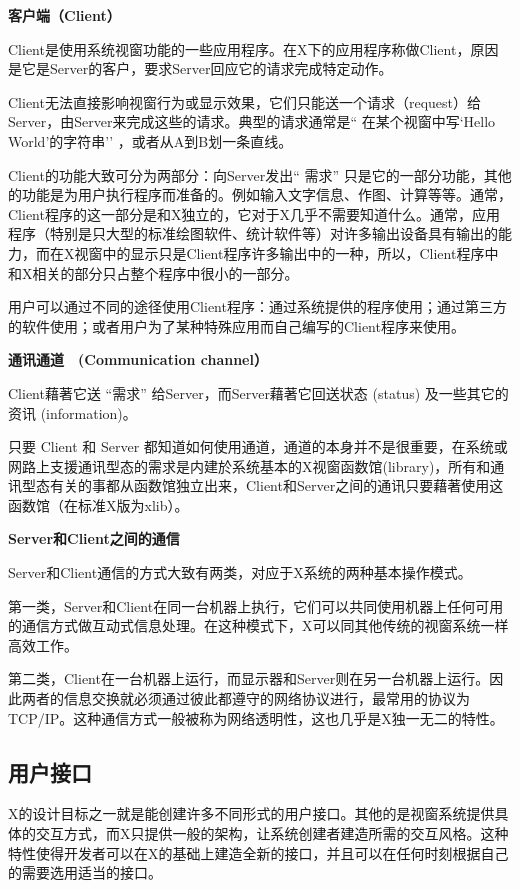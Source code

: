 \documentclass[doctor,openright,twoside]{sjtuthesis}
\theoremstyle{plain}
\theoremstyle{definition}
\theoremstyle{remark}
\theoremstyle{ocrenumbox}
\theoremstyle{plain}
\begin{document}
\textbf{客户端（Client）}

Client是使用系统视窗功能的一些应用程序。在X下的应用程序称做Client，原因是它是Server的客户，要求Server回应它的请求完成特定动作。

Client无法直接影响视窗行为或显示效果，它们只能送一个请求（request）给Server，由Server来完成这些的请求。典型的请求通常是`` 在某个视窗中写`Hello World'的字符串'' ，或者从A到B划一条直线。

Client的功能大致可分为两部分：向Server发出`` 需求'' 只是它的一部分功能，其他的功能是为用户执行程序而准备的。例如输入文字信息、作图、计算等等。通常，Client程序的这一部分是和X独立的，它对于X几乎不需要知道什么。通常，应用程序（特别是只大型的标准绘图软件、统计软件等）对许多输出设备具有输出的能力，而在X视窗中的显示只是Client程序许多输出中的一种，所以，Client程序中和X相关的部分只占整个程序中很小的一部分。

用户可以通过不同的途径使用Client程序：通过系统提供的程序使用；通过第三方的软件使用；或者用户为了某种特殊应用而自己编写的Client程序来使用。

\textbf{通讯通道　(Communication channel）}

Client藉著它送 ``需求'' 给Server，而Server藉著它回送状态 (status) 及一些其它的资讯 (information)。

只要 Client 和 Server 都知道如何使用通道，通道的本身并不是很重要，在系统或网路上支援通讯型态的需求是内建於系统基本的X视窗函数馆(library)，所有和通讯型态有关的事都从函数馆独立出来，Client和Server之间的通讯只要藉著使用这函数馆（在标准X版为xlib）。

\textbf{Server和Client之间的通信}

Server和Client通信的方式大致有两类，对应于X系统的两种基本操作模式。

第一类，Server和Client在同一台机器上执行，它们可以共同使用机器上任何可用的通信方式做互动式信息处理。在这种模式下，X可以同其他传统的视窗系统一样高效工作。

第二类，Client在一台机器上运行，而显示器和Server则在另一台机器上运行。因此两者的信息交换就必须通过彼此都遵守的网络协议进行，最常用的协议为TCP/IP。这种通信方式一般被称为网络透明性，这也几乎是X独一无二的特性。

\hypertarget{section-9}{%
\subsection{用户接口}\label{section-9}}

X的设计目标之一就是能创建许多不同形式的用户接口。其他的是视窗系统提供具体的交互方式，而X只提供一般的架构，让系统创建者建造所需的交互风格。这种特性使得开发者可以在X的基础上建造全新的接口，并且可以在任何时刻根据自己的需要选用适当的接口。
\end{document}
